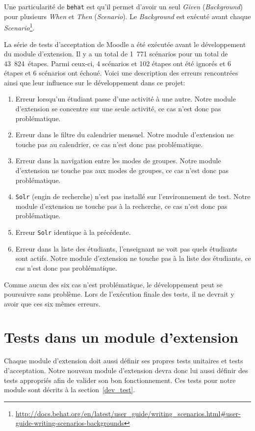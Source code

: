 Une particularité de \texttt{behat} est qu'il permet d'avoir un seul \textit{Given} (\textit{Background}) pour plusieurs \textit{When} et \textit{Then} (\textit{Scenario}).
Le \textit{Background} est ex\'ecut\'e avant chaque \textit{Scenario}\footnote{\url{http://docs.behat.org/en/latest/user\_guide/writing\_scenarios.html\#user-guide-writing-scenarios-backgrounds}}.


La s\'erie de tests d'acceptation de Moodle a \'et\'e ex\'ecut\'ee avant le d\'eveloppement du module d'extension.
Il y a un total de 1~771 sc\'enarios pour un total de 43~824~\'etapes.
Parmi ceux-ci, 4 sc\'enarios et 102 \'etapes ont \'et\'e ignor\'es et 6 \'etapes et 6 sc\'enarios ont \'echou\'e.
Voici une description des erreurs rencontr\'ees ainsi que leur influence sur le d\'eveloppement dans ce projet:
\begin{enumerate}
  \item Erreur lorsqu'un \'etudiant passe d'une activit\'e \`a une autre.
        Notre module d'extension se concentre sur une seule activit\'e, ce cas n'est donc pas probl\'ematique.
        
  \item Erreur dans le filtre du calendrier mensuel.
        Notre module d'extension ne touche pas au calendrier, ce cas n'est donc pas probl\'ematique.
        
  \item Erreur dans la navigation entre les modes de groupes.
        Notre module d'extension ne touche pas aux modes de groupes, ce cas n'est donc pas probl\'ematique.
        
  \item \texttt{Solr} (engin de recherche) n'est pas install\'e sur l'environnement de test.
        Notre module d'extension ne touche pas \`a la recherche, ce cas n'est donc pas probl\'ematique.
        
  \item Erreur \texttt{Solr} identique \`a la pr\'ec\'edente.
  
  \item Erreur dans la liste des \'etudiants, l'enseignant ne voit pas quels \'etudiants sont actifs.
        Notre module d'extension ne touche pas \`a la liste des \'etudiants, ce cas n'est donc pas probl\'ematique.
\end{enumerate}
Comme aucun des six cas n'est probl\'ematique, le d\'eveloppement peut se poursuivre sans probl\`eme.
Lors de l'ex\'ecution finale des tests, il ne devrait y avoir que ces six m\^emes erreurs.

\section{Tests dans un module d'extension}
Chaque module d'extension doit aussi d\'efinir ses propres tests unitaires et tests d'acceptation.
Notre nouveau module d'extension devra donc lui aussi d\'efinir des tests appropri\'es afin de valider son bon fonctionnement.
Ces tests pour notre module sont d\'ecrits \`a la section~\ref{dev_test}.
